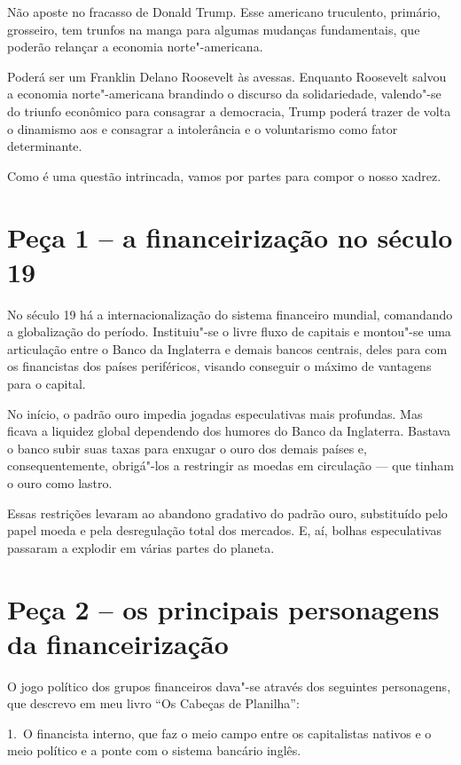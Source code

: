  

Não aposte no fracasso de Donald Trump. Esse americano truculento,
primário, grosseiro, tem trunfos na manga para algumas mudanças
fundamentais, que poderão relançar a economia norte"-americana.

Poderá ser um Franklin Delano Roosevelt às avessas. Enquanto Roosevelt
salvou a economia norte"-americana brandindo o discurso da solidariedade,
valendo"-se do triunfo econômico para consagrar a democracia, Trump
poderá trazer de volta o dinamismo aos  e consagrar a intolerância e
o voluntarismo como fator determinante.

Como é uma questão intrincada, vamos por partes para compor o nosso
xadrez.

\section{Peça 1 -- a financeirização no século 19}

No século 19 há a internacionalização do sistema financeiro mundial,
comandando a globalização do período. Instituiu"-se o livre fluxo de
capitais e montou"-se uma articulação entre o Banco da Inglaterra e
demais bancos centrais, deles para com os financistas dos países
periféricos, visando conseguir o máximo de vantagens para o capital.

No início, o padrão ouro impedia jogadas especulativas mais profundas.
Mas ficava a liquidez global dependendo dos humores do Banco da
Inglaterra. Bastava o banco subir suas taxas para enxugar o ouro dos
demais países e, consequentemente, obrigá"-los a restringir as moedas em
circulação --- que tinham o ouro como lastro.

Essas restrições levaram ao abandono gradativo do padrão ouro,
substituído pelo papel moeda e pela desregulação total dos mercados. E,
aí, bolhas especulativas passaram a explodir em várias partes do
planeta.

\section{Peça 2 -- os principais personagens da financeirização}

O jogo político dos grupos financeiros dava"-se através dos seguintes
personagens, que descrevo em meu livro ``Os Cabeças de Planilha'':

1.~O financista interno, que faz o meio campo entre os capitalistas
nativos e o meio político e a ponte com o sistema bancário inglês.


